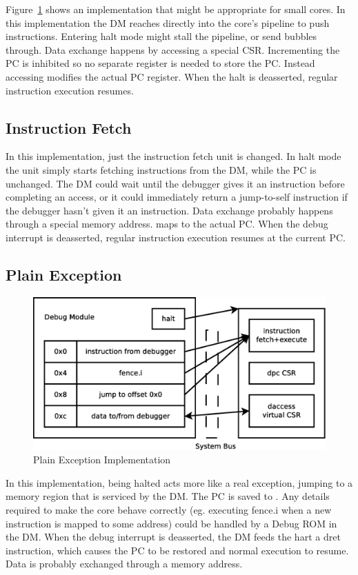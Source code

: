 \documentclass{article}
\begin{document}
Figure~\ref{fig:direct} shows an implementation that might be appropriate for
small cores.  In this implementation the DM reaches directly into the core's
pipeline to push instructions. Entering halt mode might stall the pipeline, or
send bubbles through. Data exchange happens by accessing a special CSR.
Incrementing the PC is inhibited so no separate register is needed to store the
PC. Instead accessing \Rdpc modifies the actual PC register.  When the halt is
deasserted, regular instruction execution resumes.

\subsection{Instruction Fetch}

In this implementation, just the instruction fetch unit is changed. In halt
mode the unit simply starts fetching instructions from the DM, while the PC is
unchanged. The DM could wait until the debugger gives it an instruction before
completing an access, or it could immediately return a jump-to-self instruction
if the debugger hasn't given it an instruction. Data exchange probably happens
through a special memory address. \Rdpc maps to the actual PC. When the debug
interrupt is deasserted, regular instruction execution resumes at the current
PC.

\subsection{Plain Exception}

\begin{figure}
   \centering
   \includegraphics[width=\textwidth]{plain-exception.eps}
   \caption{Plain Exception Implementation}
   \label{fig:direct}
\end{figure}

In this implementation, being halted acts more like a real exception, jumping
to a memory region that is serviced by the DM. The PC is saved to \Rdpc. Any
details required to make the core behave correctly (eg.  executing fence.i when
a new instruction is mapped to some address) could be handled by a Debug ROM in
the DM. When the debug interrupt is deasserted, the DM feeds the hart a dret
instruction, which causes the PC to be restored and normal execution to resume.
Data is probably exchanged through a memory address.
\end{document}
